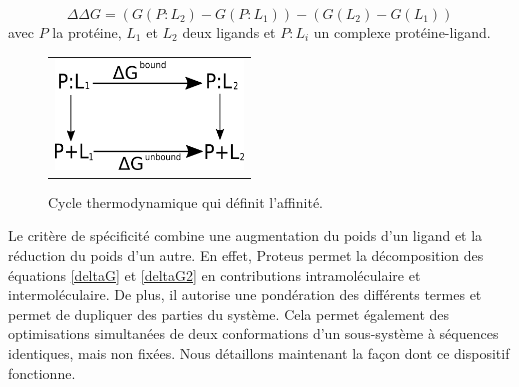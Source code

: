  \begin{equation}
   \label{deltaG2}
\Delta \Delta G = (G(P:L_2)- G(P:L_1)) - (G(L_2) - G(L_1))
\end{equation}  
avec $P$ la protéine, $L_1$ et $L_2$ deux ligands et $P:L_i$ un complexe protéine-ligand. 

   \begin{figure}[!htbp]
     \centering
     \begin{tabular}{c}
       \includegraphics[width=5cm]{figure/cycleThermoLigand.png} 
     \end{tabular}
     \caption{Cycle thermodynamique qui définit l'affinité.}
\label{fig:cycleThermoLigand}
   \end{figure}
Le critère de spécificité combine une augmentation du poids d'un ligand et la réduction du poids d'un autre. En effet, Proteus permet la décomposition des équations \ref{deltaG} et \ref{deltaG2} en contributions intramoléculaire et intermoléculaire. De plus, il autorise une pondération des différents termes et permet de dupliquer des parties du système. Cela permet également des optimisations simultanées de deux conformations d'un sous-système à séquences identiques, mais non fixées. Nous détaillons maintenant la façon dont ce dispositif fonctionne.

